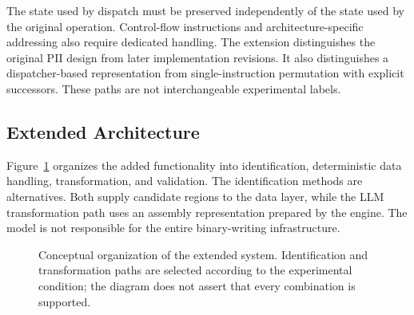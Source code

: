 The state used by dispatch must be preserved independently of the state
used by the original operation. Control-flow instructions and
architecture-specific addressing also require dedicated handling.
The extension distinguishes the original PII design from later
implementation revisions. It also distinguishes a dispatcher-based
representation from single-instruction permutation with explicit
successors. These paths are not interchangeable experimental labels.

\subsection{Extended Architecture}
Figure~\ref{fig:extended_architecture} organizes the added functionality
into identification, deterministic data handling, transformation, and
validation. The identification methods are alternatives. Both supply
candidate regions to the data layer, while the LLM transformation path
uses an assembly representation prepared by the engine. The model is
not responsible for the entire binary-writing infrastructure.

\begin{figure}[t]
\centering
{}
\caption{Conceptual organization of the extended system. Identification
and transformation paths are selected according to the experimental
condition; the diagram does not assert that every combination is supported.}
\label{fig:extended_architecture}
\end{figure}

